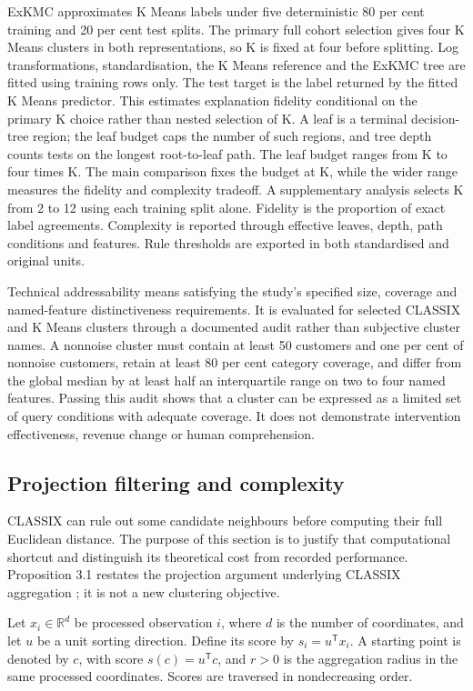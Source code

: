 ExKMC approximates K Means labels under five deterministic 80 per cent training and 20 per cent test splits. The primary full cohort selection gives four K Means clusters in both representations, so K is fixed at four before splitting. Log transformations, standardisation, the K Means reference and the ExKMC tree are fitted using training rows only. The test target is the label returned by the fitted K Means predictor. This estimates explanation fidelity conditional on the primary K choice rather than nested selection of K. A leaf is a terminal decision-tree region; the leaf budget caps the number of such regions, and tree depth counts tests on the longest root-to-leaf path. The leaf budget ranges from K to four times K. The main comparison fixes the budget at K, while the wider range measures the fidelity and complexity tradeoff. A supplementary analysis selects K from 2 to 12 using each training split alone. Fidelity is the proportion of exact label agreements. Complexity is reported through effective leaves, depth, path conditions and features. Rule thresholds are exported in both standardised and original units.

Technical addressability means satisfying the study's specified size, coverage and named-feature distinctiveness requirements. It is evaluated for selected CLASSIX and K Means clusters through a documented audit rather than subjective cluster names. A nonnoise cluster must contain at least 50 customers and one per cent of nonnoise customers, retain at least 80 per cent category coverage, and differ from the global median by at least half an interquartile range on two to four named features. Passing this audit shows that a cluster can be expressed as a limited set of query conditions with adequate coverage. It does not demonstrate intervention effectiveness, revenue change or human comprehension.

\subsection{Projection filtering and complexity}

CLASSIX can rule out some candidate neighbours before computing their full Euclidean distance. The purpose of this section is to justify that computational shortcut and distinguish its theoretical cost from recorded performance. Proposition 3.1 restates the projection argument underlying CLASSIX aggregation \citep{chen2024classix}; it is not a new clustering objective.

Let $x_i\in\mathbb{R}^d$ be processed observation $i$, where $d$ is the number of coordinates, and let $u$ be a unit sorting direction. Define its score by $s_i=u^{\mathsf T}x_i$. A starting point is denoted by $c$, with score $s(c)=u^{\mathsf T}c$, and $r>0$ is the aggregation radius in the same processed coordinates. Scores are traversed in nondecreasing order.

